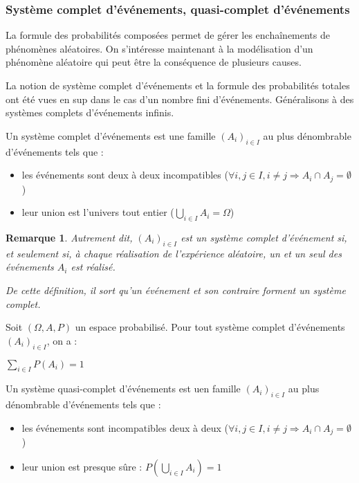 \documentclass[a4paper,12pt]{book}
\newcommand{\Def}[2]{\begin{tcolorbox}[sharp corners, colback=white,colframe=blue!90!black!75, title=Définition : #1]#2\end{tcolorbox}}
\newcommand{\Thr}[2]{\begin{tcolorbox}[sharp corners, colback=white,colframe=red!90!black!75, title=Théorème : #1]#2\end{tcolorbox}}
\newtheorem{Rem}{Remarque}[section]
\begin{document}
\subsubsection{Système complet d'événements, quasi-complet d'événements}
La formule des probabilités composées permet de gérer les enchaînements de phénomènes aléatoires. On s'intéresse maintenant à la modélisation d'un phénomène aléatoire qui peut être la conséquence de plusieurs causes.
\par La notion de système complet d'événements et la formule des probabilités totales ont été vues en sup dans le cas d'un nombre fini d'événements. Généralisons à des systèmes complets d'événements infinis.
\Def{}{Un système complet d'événements est une famille $(A_i)_{i\in I}$ au plus dénombrable d'événements tels que :\begin{itemize}
\item les événements sont deux à deux incompatibles ($\forall i,j\in I, i\neq j\Rightarrow A_i\cap A_j=\emptyset$)
\item leur union est l'univers tout entier ($\bigcup_{i\in I}A_i=\Omega$)
\end{itemize}}
\begin{Rem}
Autrement dit, $(A_i)_{i\in I}$ est un système complet d'événement si, et seulement si, à chaque réalisation de l'expérience aléatoire, un et un seul des événements $A_i$ est réalisé.
\par De cette définition, il sort qu'un événement et son contraire forment un système complet.
\end{Rem}
\Thr{}{Soit $(\Omega, A, P)$ un espace probabilisé. Pour tout système complet d'événements $(A_i)_{i\in I}$, on a :
\par \begin{center}$\sum\limits_{i\in I}P(A_i)=1$\end{center}}
\Def{}{Un système quasi-complet d'événements est uen famille $(A_i)_{i\in I}$ au plus dénombrable d'événements tels que :\begin{itemize}
\item les événements sont incompatibles deux à deux ($\forall i,j\in I, i\neq j\Rightarrow A_i\cap A_j=\emptyset$)
\item leur union est presque sûre : $P\left(\bigcup_{i\in I}A_i\right)=1$
\end{itemize}}
\end{document}
